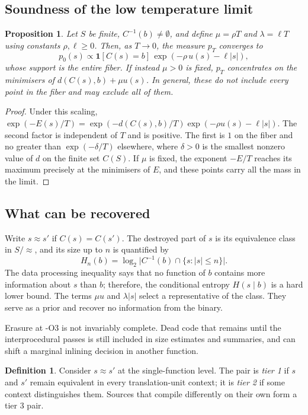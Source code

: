 \documentclass[11pt]{article}
\newtheorem{proposition}[theorem]{Proposition}
\theoremstyle{definition}
\newtheorem{definition}[theorem]{Definition}
\theoremstyle{remark}
\begin{document}
\subsection{Soundness of the low temperature limit}

\begin{proposition}\label{prop:scaling}
Let $S$ be finite, $C^{-1}(b) \neq \emptyset$, and define $\mu = \rho T$ and $\lambda = \ell T$ using constants $\rho, \ell \ge 0$. Then, as $T \to 0$, the measure $p_T$ converges to
\[
  p_0(s) \propto \mathbf{1}[C(s) = b] \, \exp(-\rho\, u(s) - \ell |s|),
\]
whose support is the entire fiber. If instead $\mu > 0$ is fixed, $p_T$ concentrates on the minimisers of $d(C(s), b) + \mu u(s)$. In general, these do not include every point in the fiber and may exclude all of them.
\end{proposition}

\begin{proof}
Under this scaling, $\exp(-E(s)/T) = \exp(-d(C(s), b)/T) \exp(-\rho u(s) - \ell |s|)$. The second factor is independent of $T$ and is positive. The first is $1$ on the fiber and no greater than $\exp(-\delta/T)$ elsewhere, where $\delta > 0$ is the smallest nonzero value of $d$ on the finite set $C(S)$. If $\mu$ is fixed, the exponent $-E/T$ reaches its maximum precisely at the minimisers of $E$, and these points carry all the mass in the limit.
\end{proof}

\subsection{What can be recovered}

Write $s \approx s'$ if $C(s) = C(s')$. The destroyed part of $s$ is its equivalence class in $S/{\approx}$, and its size up to $n$ is quantified by
\[
  H_n(b) = \log_2 \big| C^{-1}(b) \cap \{ s : |s| \le n \} \big|.
\]
The data processing inequality says that no function of $b$ contains more information about $s$ than $b$; therefore, the conditional entropy $H(s \mid b)$ is a hard lower bound. The terms $\mu u$ and $\lambda |s|$ select a representative of the class. They serve as a prior and recover no information from the binary.

Erasure at -O3 is not invariably complete. Dead code that remains until the interprocedural passes is still included in size estimates and summaries, and can shift a marginal inlining decision in another function.

\begin{definition}
Consider $s \approx s'$ at the single-function level. The pair is \emph{tier 1} if $s$ and $s'$ remain equivalent in every translation-unit context; it is \emph{tier 2} if some context distinguishes them. Sources that compile differently on their own form a tier 3 pair.
\end{definition}
\end{document}
